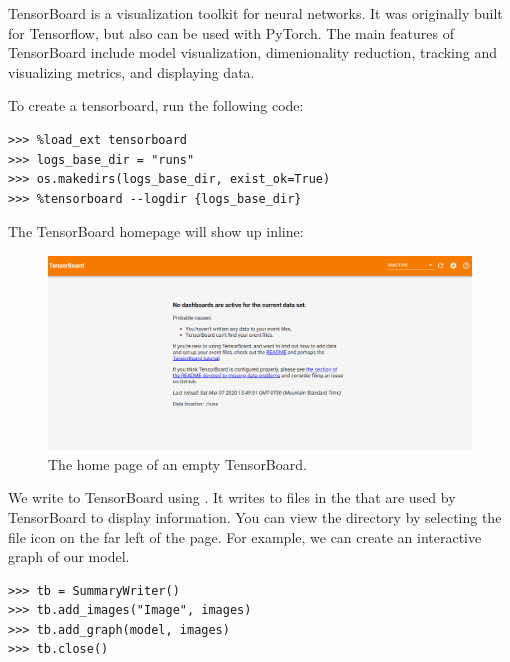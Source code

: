 TensorBoard is a visualization toolkit for neural networks. 
It was originally built for Tensorflow, but also can be used with PyTorch.
The main features of TensorBoard include model visualization, dimenionality reduction, tracking and visualizing metrics, and displaying data.

To create a tensorboard, run the following code:
\begin{lstlisting}
>>> %load_ext tensorboard
>>> logs_base_dir = "runs"
>>> os.makedirs(logs_base_dir, exist_ok=True)
>>> %tensorboard --logdir {logs_base_dir}
\end{lstlisting}
The TensorBoard homepage will show up inline:
\begin{figure}[H] %
    \centering
    \includegraphics[width=\textwidth]{figures/tensor_board_home.png}

\caption{The home page of an empty TensorBoard.}
\label{fig:tboard_home}
\end{figure}

We write to TensorBoard using .
It writes to files in the  that are used by TensorBoard to display information.
You can view the  directory by selecting the file icon on the far left of the page.
For example, we can create an interactive graph of our model.

\begin{lstlisting}
>>> tb = SummaryWriter()
>>> tb.add_images("Image", images)
>>> tb.add_graph(model, images)
>>> tb.close()
\end{lstlisting}

